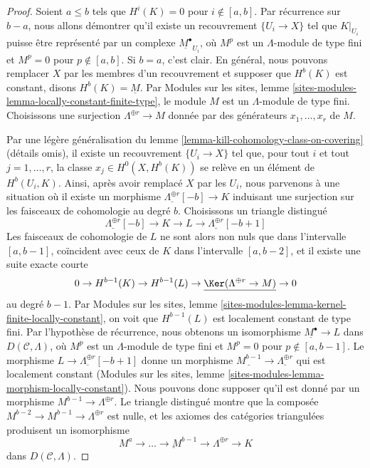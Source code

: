 \begin{proof}
Soient $a \leq b$ tels que $H^i(K) = 0$ pour $i \not \in [a, b]$. Par
récurrence sur $b - a$, nous allons démontrer qu'il existe un recouvrement
$\{U_i \to X\}$ tel que $K|_{U_i}$ puisse être représenté par un complexe
$\underline{M^\bullet}_{U_i}$, où $M^p$ est un $\Lambda$-module de type fini
et $M^p = 0$ pour $p \not \in [a, b]$. Si $b = a$, c'est clair. En général,
nous pouvons remplacer $X$ par les membres d'un recouvrement et supposer que
$H^b(K)$ est constant, disons $H^b(K) = \underline{M}$. Par Modules sur les sites,
lemme \ref{sites-modules-lemma-locally-constant-finite-type}, le module $M$
est un $\Lambda$-module de type fini. Choisissons une surjection
$\Lambda^{\oplus r} \to M$ donnée par des générateurs $x_1, \ldots, x_r$ de
$M$.

\medskip\noindent
Par une légère généralisation du lemme
\ref{lemma-kill-cohomology-class-on-covering} (détails omis), il existe un
recouvrement $\{U_i \to X\}$ tel que, pour tout $i$ et tout $j = 1, \ldots, r$,
la classe $x_j \in H^0(X, H^b(K))$ se relève en un élément de $H^b(U_i, K)$.
Ainsi, après avoir remplacé $X$ par les $U_i$, nous
parvenons à une situation où il existe un morphisme
$\underline{\Lambda^{\oplus r}}[-b] \to K$ induisant une surjection sur les
faisceaux de cohomologie au degré $b$. Choisissons un triangle distingué
$$
\underline{\Lambda^{\oplus r}}[-b] \to K \to L \to
\underline{\Lambda^{\oplus r}}[-b + 1]
$$
Les faisceaux de cohomologie de $L$ ne sont alors non nuls que dans
l'intervalle $[a, b - 1]$, coïncident avec ceux de $K$ dans l'intervalle
$[a, b - 2]$, et il existe une suite exacte courte
$$
0 \to H^{b - 1}(K) \to H^{b - 1}(L) \to
\underline{\Ker(\Lambda^{\oplus r} \to M)} \to 0
$$
au degré $b - 1$. Par Modules sur les sites, lemme
\ref{sites-modules-lemma-kernel-finite-locally-constant}, on voit que
$H^{b - 1}(L)$ est localement constant de type fini. Par l'hypothèse de
récurrence, nous obtenons un isomorphisme
$\underline{M^\bullet} \to L$ dans $D(\mathcal{C}, \Lambda)$,
où $M^p$ est un $\Lambda$-module de type fini et $M^p = 0$ pour
$p \not \in [a, b - 1]$. Le morphisme
$L \to \underline{\Lambda^{\oplus r}}[-b + 1]$ donne un morphisme
$\underline{M^{b - 1}} \to \underline{\Lambda^{\oplus r}}$ qui est
localement constant (Modules sur les sites, lemme
\ref{sites-modules-lemma-morphism-locally-constant}). Nous pouvons donc
supposer qu'il est donné par un morphisme
$M^{b - 1} \to \Lambda^{\oplus r}$. Le triangle distingué montre que la
composée $M^{b - 2} \to M^{b - 1} \to \Lambda^{\oplus r}$ est nulle, et les
axiomes des catégories triangulées produisent un isomorphisme
$$
\underline{M^a \to \ldots \to M^{b - 1} \to \Lambda^{\oplus r}}
\longrightarrow K
$$
dans $D(\mathcal{C}, \Lambda)$.
\end{proof}

